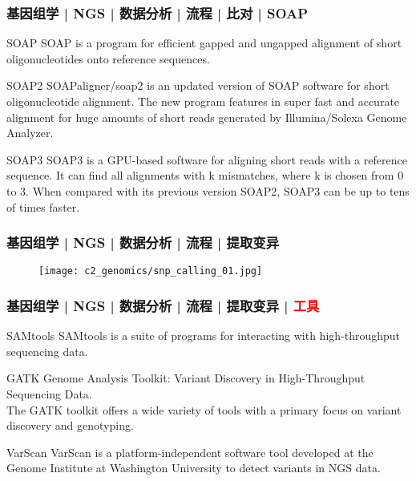 \begin{frame}
  \frametitle{基因组学 | NGS | 数据分析 | 流程 | 比对 | SOAP}
  \begin{block}{SOAP}
    SOAP is a program for efficient gapped and ungapped alignment of short oligonucleotides onto reference sequences.
  \end{block}
  \pause
  \begin{block}{SOAP2}
    SOAPaligner/soap2 is an updated version of SOAP software for short oligonucleotide alignment. The new program features in super fast and accurate alignment for huge amounts of short reads generated by Illumina/Solexa Genome Analyzer.
  \end{block}
  \pause
  \begin{block}{SOAP3}
    SOAP3 is a GPU-based software for aligning short reads with a reference sequence. It can find all alignments with k mismatches, where k is chosen from 0 to 3. When compared with its previous version SOAP2, SOAP3 can be up to tens of times faster.
  \end{block}
\end{frame}

\begin{frame}
  \frametitle{基因组学 | NGS | 数据分析 | 流程 | 提取变异}
  \begin{figure}
    \centering
    \texttt{[image: c2\_genomics/snp\_calling\_01.jpg]}
  \end{figure}
\end{frame}

\begin{frame}
  \frametitle{基因组学 | NGS | 数据分析 | 流程 | 提取变异 | \textcolor{red}{工具}}
  \begin{block}{SAMtools}
    SAMtools is a suite of programs for interacting with high-throughput sequencing data.
  \end{block}
  \pause
  \begin{block}{GATK}
    Genome Analysis Toolkit: Variant Discovery in High-Throughput Sequencing Data.\\
    The GATK toolkit offers a wide variety of tools with a primary focus on variant discovery and genotyping.
  \end{block}
  \pause
  \begin{block}{VarScan}
    VarScan is a platform-independent software tool developed at the Genome Institute at Washington University to detect variants in NGS data.
  \end{block}
\end{frame}

